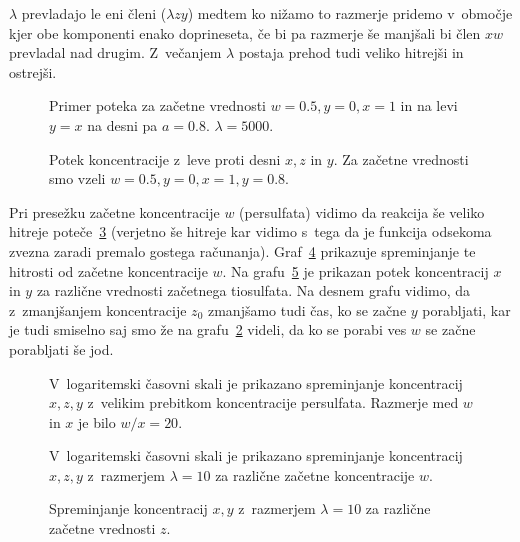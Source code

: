 \documentclass[a4paper,pdftex,12pt]{article}
\numberwithin{figure}{section} %
\begin{document}
$\lambda$ prevladajo le eni členi ($\lambda z y$) medtem ko nižamo to razmerje pridemo
v~območje kjer obe komponenti enako doprineseta, če bi pa razmerje še manjšali
bi člen $xw$ prevladal nad drugim. Z~večanjem $\lambda$ postaja prehod tudi veliko hitrejši
in ostrejši.
\begin{figure}    
    \hspace{1cm}\resizebox{0.9\linewidth}{!}{}
    \caption{Primer poteka za začetne vrednosti $w=0.5, y=0, x=1$ in na levi $y=x$
    na desni pa $a=0.8$. $\lambda=5000$.}
    \label{slika10}
\end{figure}
\begin{figure}    
    \hspace{1cm}\resizebox{0.9\linewidth}{!}{}
    \caption{Potek koncentracije z~leve proti desni $x,z$ in $y$. Za začetne vrednosti smo
    vzeli $w=0.5, y=0, x=1, y=0.8$.}
    \label{slika11}
\end{figure}
Pri presežku začetne koncentracije $w$ (persulfata) vidimo da reakcija še veliko hitreje
poteče~\ref{slika12} (verjetno še hitreje kar vidimo s~tega da je funkcija odsekoma zvezna
zaradi premalo gostega računanja). Graf~\ref{slika13} prikazuje spreminjanje te hitrosti
od začetne koncentracije $w$. Na grafu~\ref{slika14} je prikazan potek koncentracij $x$ in
$y$ za različne vrednosti začetnega tiosulfata. Na desnem grafu vidimo, da z~zmanjšanjem 
koncentracije $z_0$ zmanjšamo tudi čas, ko se začne $y$ porabljati, kar je tudi smiselno
saj smo že na grafu~\ref{slika11} videli, da ko se porabi ves $w$ se začne porabljati
še jod.
\begin{figure}    
    \hspace{1cm}\resizebox{0.9\linewidth}{!}{}
    \caption{V~logaritemski časovni skali je prikazano spreminjanje koncentracij $x,z,y$
    z~velikim prebitkom koncentracije persulfata. Razmerje med $w$ in $x$ je bilo $w/x=20$.}
    \label{slika12}
\end{figure}
\begin{figure}    
    \hspace{1cm}\resizebox{0.9\linewidth}{!}{}
    \caption{V~logaritemski časovni skali je prikazano spreminjanje koncentracij $x,z,y$
    z~razmerjem $\lambda=10$ za različne začetne koncentracije $w$.}
    \label{slika13}
\end{figure}
\begin{figure}    
    \hspace{1cm}\resizebox{0.9\linewidth}{!}{}
    \caption{Spreminjanje koncentracij $x,y$ z~razmerjem $\lambda=10$ za različne začetne 
    vrednosti $z$.}
    \label{slika14}
\end{figure}
\end{document}
